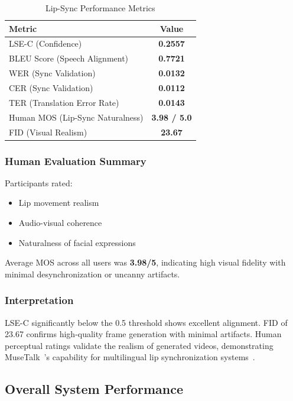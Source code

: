 \documentclass[12pt,oneside]{report}
\begin{document}
\begin{table}[H]
\centering
\caption{Lip-Sync Performance Metrics}
\label{tab:lipsync-results}
\begin{tabular}{@{}lc@{}}
\toprule
\textbf{Metric} & \textbf{Value} \\
\midrule
LSE-C (Confidence) & \textbf{0.2557} \\
BLEU Score (Speech Alignment) & \textbf{0.7721} \\
WER (Sync Validation) & \textbf{0.0132} \\
CER (Sync Validation) & \textbf{0.0112} \\
TER (Translation Error Rate) & \textbf{0.0143} \\
Human MOS (Lip-Sync Naturalness) & \textbf{3.98 / 5.0} \\
FID (Visual Realism) & \textbf{23.67} \\
\bottomrule
\end{tabular}
\end{table}

\subsubsection*{Human Evaluation Summary}

Participants rated:
\begin{itemize}
    \item Lip movement realism  
    \item Audio-visual coherence  
    \item Naturalness of facial expressions  
\end{itemize}

Average MOS across all users was \textbf{3.98/5}, indicating high visual fidelity with minimal desynchronization or uncanny artifacts.

\subsubsection*{Interpretation}

LSE-C significantly below the 0.5 threshold shows excellent alignment.  
FID of 23.67 confirms high-quality frame generation with minimal artifacts.  
Human perceptual ratings validate the realism of generated videos, demonstrating MuseTalk~\cite{zhang2023musetalk}'s capability for multilingual lip synchronization systems~\cite{oskooei2025multilingual}.


\subsection{Overall System Performance}
\end{document}
